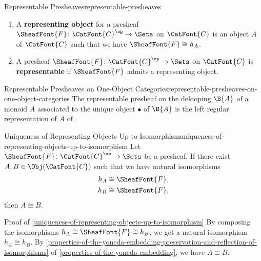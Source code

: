 \begin{definition}{Representable Presheaves}{representable-presheaves}
\begin{enumerate}
\begin{itemize}
            \end{itemize}
        \item\label{representable-presheaves-representing-objects-for-presheaves}A \textbf{representing object} for a presheaf $\SheafFont{F}\colon\CatFont{C}^{\op}\to\Sets$ on $\CatFont{C}$ is an object $A$ of $\CatFont{C}$ such that we have $\SheafFont{F}\cong h_{A}$.
        \item\label{representable-presheaves-representable-presheaves}A presheaf $\SheafFont{F}\colon\CatFont{C}^{\op}\to\Sets$ on $\CatFont{C}$ is \textbf{representable} if $\SheafFont{F}$ admits a representing object.
    \end{enumerate}
\end{definition}
\begin{example}{Representable Presheaves on One-Object Categories}{representable-presheaves-on-one-object-categories}%
    The representable presheaf on the delooping $\B{A}$ of a monoid $A$ associated to the unique object $\bullet$ of $\B{A}$ is the left regular representation of $A$ of .
\end{example}
\begin{proposition}{Uniqueness of Representing Objects Up to Isomorphism}{uniqueness-of-representing-objects-up-to-isomorphism}%
    Let $\SheafFont{F}\colon\CatFont{C}^{\op}\to\Sets$ be a presheaf. If there exist $A,B\in\Obj(\CatFont{C})$ such that we have natural isomorphisms
    \begin{align*}
        h_{A} &\cong\SheafFont{F},\\
        h_{B} &\cong\SheafFont{F},
    \end{align*}
    then $A\cong B$.
\end{proposition}
\begin{Proof}{Proof of \cref{uniqueness-of-representing-objects-up-to-isomorphism}}%
    By composing the isomorphisms $h_{A}\cong\SheafFont{F}\cong h_{B}$, we get a natural isomorphism $h_{A}\cong h_{B}$. By \cref{properties-of-the-yoneda-embedding-preservation-and-reflection-of-isomorphisms} of \cref{properties-of-the-yoneda-embedding}, we have $A\cong B$.
\end{Proof}
